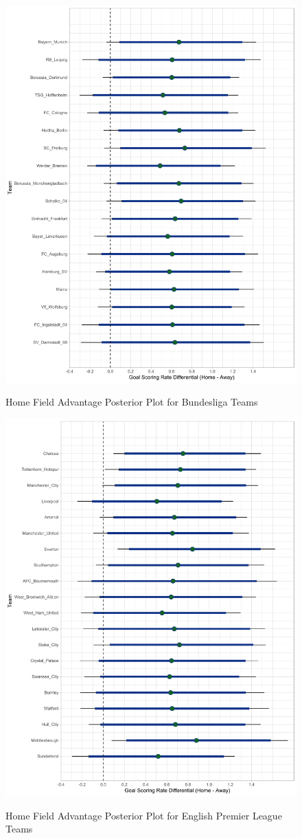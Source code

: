\documentclass[USenglish]{article}
\begin{document}
\begin{figure}
\caption{Home Field Advantage Posterior Plot for Bundesliga Teams}
{\includegraphics[width=0.90\linewidth]{HFA_Bundesliga11.pdf}}
\label{fig6}
\end{figure}

\begin{figure}
\caption{Home Field Advantage Posterior Plot for English Premier League Teams}
{\includegraphics[width=0.90\linewidth]{HFA_EPL11.pdf}}
\label{fig7}
\end{figure}
\end{document}
